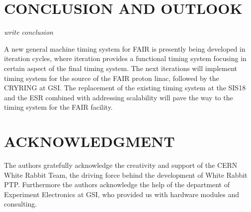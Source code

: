 \section{CONCLUSION AND OUTLOOK}

\textit{write conclusion}

A new general machine timing system for FAIR is presently being developed in
iteration cycles, where iteration provides a functional timing system
focusing in certain aspect of the final timing system. 
The next iterations  will implement timing system  for the source of the FAIR proton linac, 
followed by the CRYRING at GSI. The replacement of the existing timing 
system at the SIS18 and the ESR combined with addressing scalability will 
pave the way to the timing system for the FAIR facility.

\section{ACKNOWLEDGMENT}
The authors gratefully acknowledge the creativity and
support of the CERN White Rabbit Team, the driving force
behind the development of White Rabbit PTP. Furthermore
the authors acknowledge the help of the department of 
Experiment Electronics at GSI, who provided us with hardware modules and consulting.


